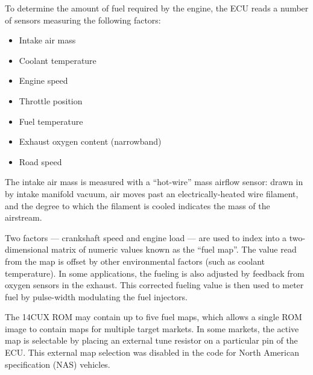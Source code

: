 \documentclass[11pt,twocolumn]{scrartcl}
\begin{document}
To determine the amount of fuel required by the engine, the ECU reads a number of sensors measuring the following factors:
\begin{itemize}
\item Intake air mass
\item Coolant temperature
\item Engine speed
\item Throttle position
\item Fuel temperature
\item Exhaust oxygen content (narrowband)
\item Road speed
\end{itemize}

The intake air mass is measured with a ``hot-wire'' mass airflow sensor: drawn in by intake manifold vacuum, air moves past an electrically-heated wire filament, and the degree to which the filament is cooled indicates the mass of the airstream.

Two factors --- crankshaft speed and engine load --- are used to index into a two-dimensional matrix of numeric values known as the ``fuel map''. The value read from the map is offset by other environmental factors (such as coolant temperature). In some applications, the fueling is also adjusted by feedback from oxygen sensors in the exhaust. This corrected fueling value is then used to meter fuel by pulse-width modulating the fuel injectors.

The 14CUX ROM may contain up to five fuel maps, which allows a single ROM image to contain maps for multiple target markets. In some markets, the active map is selectable by placing an external tune resistor on a particular pin of the ECU. This external map selection was disabled in the code for North American specification (NAS) vehicles.
\end{document}
